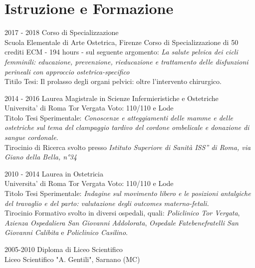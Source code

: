 \documentclass[11pt]{friggeri-cv}
\begin{document}
\section{Istruzione e Formazione}
\begin{entrylist}
	\entry
	{2017 - 2018}
	{Corso di Specializzazione}
	{\\Scuola Elementale di Arte Ostetrica, Firenze}
	{Corso di Specializzazione di 50 crediti ECM - 194 hours - sul seguente 
	argomento: \emph{La salute pelvica dei cicli femminili: educazione, prevenzione, 
	rieducazione e trattamento delle disfunzioni perineali con approccio 
	ostetrica-specifico}\\ 
  Titilo Tesi: Il prolasso degli organi pelvici: oltre l’intervento chirurgico.\\}

	\entry
	{2014 - 2016}
	{Laurea Magistrale in Scienze Infermieristiche e Ostetriche}
	{\\Universita' di Roma Tor Vergata}
	{Voto: 110/110 e Lode\\ Titolo Tesi Sperimentale: \emph{Conoscenze e 
	atteggiamenti delle mamme e delle ostetriche sul tema del clampaggio tardivo del 
	cordone ombelicale e donazione di sangue cordonale.} \\Tirocinio di Ricerca svolto 
	presso \textit{Istituto Superiore di Sanità ISS” di Roma, via Giano della Bella, 
	n°34}\\}
	
	\entry
	{2010 - 2014}
	{Laurea in Ostetricia}
	{\\Universita' di Roma Tor Vergata}
	{Voto: 110/110 e Lode\\
    Titolo Tesi Sperimentale: \emph{Indagine sul movimento libero e le posizioni 
    antalgiche del travaglio e del parto: valutazione degli outcomes materno-fetali.} \\
    Tirocinio Formativo svolto in diversi ospedali, quali: \textit{Policlinico Tor 
    Vergata}, \textit{Azienza Ospedaliera San Giovanni Addolorata}, 
    \textit{Ospedale Fatebenefratelli San Giovanni Calibita} e \textit{Policlinico 
    Casilino}.\\}

	\entry
	{2005-2010}
	{Diploma di Liceo Scientifico}
	{\\Liceo Scientifico "A. Gentili", Sarnano (MC)}
	{\\}
\end{entrylist}

\vspace{-25pt}
\end{document}
